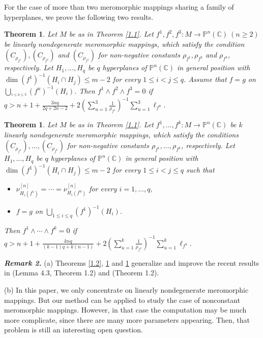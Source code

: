 \documentclass[12pt, a4paper, oneside]{amsart}
\def\overset#1#2{{\mathrel{\mathop {{#2}_{}}\limits^{#1}}}}
\newtheorem{theorem}[equation]{Theorem}
\newcommand{\C}{{\mathbb{C}}}
\renewcommand{\P}{{\mathbb{P}}}
\numberwithin{equation}{section}
\begin{document}
For the case of more than two meromorphic mappings sharing a family of hyperplanes, we prove the following two results.
\begin{theorem}\label{1.3}
Let $M$ be as in Theorem \ref{1.1}. Let $f^1,f^2,f^3: M \rightarrow\P^n(\C)\ (n\ge 2)$ be linearly nondegenerate meromorphic mappings, which satisfy the condition $(C_{\rho_{f^1}}),(C_{\rho_{f^2}})$ and $(C_{\rho_{f^3}})$ for non-negative constants $\rho_{f^1},\rho_{f^2}$ and $\rho_{f^3}$, respectively. Let $H_1,\ldots,H_q$ be $q$ hyperplanes of $\P^n(\C)$ in general position with $\dim (f^1)^{-1}(H_i\cap H_j)\le m-2$ for every $1\le i<j\le q$. Assume that $f=g$ on $\bigcup_{\overset{1\le u\le 3}{1\le i\le q}}(f^u)^{-1}(H_i)$. Then $f^1\wedge f^2\wedge f^3=0$ if $ q>n+1+\frac{3nq}{2q+2n-2}+2\left(\sum_{u=1}^3\frac{1}{\rho_{f^u}}\right)^{-1}\sum_{u=1}^3\ell_{f^u}.$
\end{theorem}

\begin{theorem}\label{1.4}
Let $M$ be as in Theorem \ref{1.1}. Let $f^1,\ldots,f^k: M \rightarrow\P^n(\C)$ be $k$ linearly nondegenerate meromorphic mappings, which satisfy the conditions $(C_{\rho_{f^u}}),\ldots,(C_{\rho_{f^k}})$ for non-negative constants $\rho_{f^1},\ldots,\rho_{f^k}$, respectively. Let $H_1,\ldots,H_q$ be $q$ hyperplanes of $\P^n(\C)$ in general position with $\dim (f^1)^{-1}(H_i\cap H_j)\le m-2$ for every $1\le i<j\le q$ such that
\begin{itemize}
\item[(i)] $\nu^{[n]}_{H_i(f^1)}=\cdots=\nu^{[n]}_{H_i(f^u)}$ for every $i=1,\ldots,q,$
\item[(ii)] $f=g$ on $\bigcup_{1\le i\le q}(f^1)^{-1}(H_i)$. 
\end{itemize}
Then $f^1\wedge \cdots\wedge f^k=0$ if $q>n+1+\frac{knq}{(k-1)q+k(n-1)}+2\left(\sum_{u=1}^k\frac{1}{\rho_{f^u}}\right)^{-1}\sum_{u=1}^k\ell_{f^u}.$
\end{theorem}

\textbf{\textit{Remark 2.}} (a) Theorems \ref{1.2}, \ref{1.3} and \ref{1.4} generalize and improve the recent results in \cite{Q21} (Lemma 4.3, Theorem 1.2) and \cite{Q22} (Theorem 1.2).

(b) In this paper, we only concentrate on linearly nondegenerate meromorphic mappings. But our method can be applied to study the case of nonconstant meromorphic mappings. However, in that case the computation may be much more complicate, since there are many more parameters appearing. Then, that problem is still an interesting open question.
 
\end{document}
